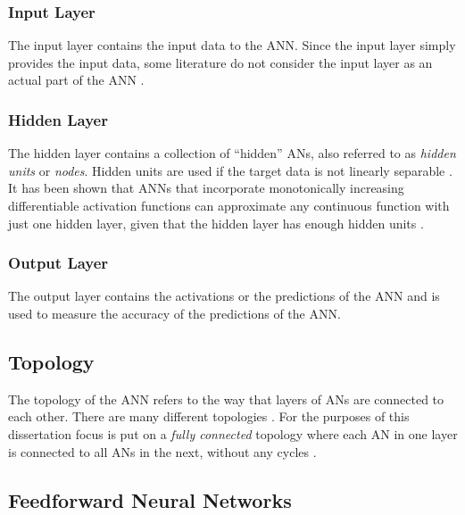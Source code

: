 \subsubsection{Input Layer}\label{sec:anns:anns:architecture:input}

The input layer contains the input data to the \ac{ANN}. Since the input layer simply provides the input data, some literature do not consider the input layer as an actual part of the \ac{ANN} \cite{ref:engelbrecht:2007}.

\subsubsection{Hidden Layer}\label{sec:anns:anns:architecture:hidden}

The hidden layer contains a collection of ``hidden'' \acp{AN}, also referred to as \textit{hidden units} or \textit{nodes}. Hidden units are used if the target data is not linearly separable \cite{ref:engelbrecht:2007}. It has been shown that \acp{ANN} that incorporate monotonically increasing differentiable activation functions can approximate any continuous function with just one hidden layer, given that the hidden layer has enough hidden units \cite{ref:hornik:1989}.

\subsubsection{Output Layer}\label{sec:anns:anns:architecture:output}

The output layer contains the activations or the predictions of the \ac{ANN} and is used to measure the accuracy of the predictions of the \ac{ANN}.


\subsection{Topology}
\label{sec:anns:anns:topology}

The topology of the \ac{ANN} refers to the way that layers of \acp{AN} are connected to each other. There are many different topologies \cite{ref:miikkulainen:2010}. For the purposes of this dissertation focus is put on a \textit{fully connected} topology where each \ac{AN} in one layer is connected to all \acp{AN} in the next, without any cycles \cite{ref:zell:1994}.


\subsection{Feedforward Neural Networks}\label{sec:anns:anns:ffnns}

